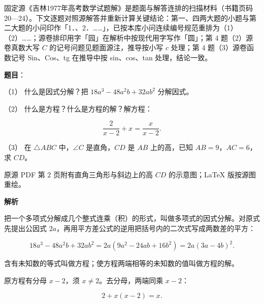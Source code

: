 

\begin{gktip}
固定源《吉林1977年高考数学试题解》是题面与解答连排的扫描材料（书籍页码 20—24）。下文逐题对照源解答并重新计算关键结论：第一、四两大题的小题与第二大题的小问印作「1．、2．……」，已按本库小问连续编号规范重排为（1）（2）……；源卷排印用字「园」在解析中按现代用字写作「圆」；第 4 题（2）源卷真数大写 $C$ 的记号问题见题面源注，推导按小写 $c$ 处理；第 4 题（3）源卷函数记号 Sin、Cos、tg 在推导中按 sin、cos、tan 处理，结论一致。
\end{gktip}

\begin{answer}

\textbf{题目}：

（1） 什么是因式分解？把 $18a^3-48a^2b+32ab^2$ 分解因式。

（2） 什么是方程？什么是方程的解？解方程：

\nopagebreak[4]
\[
\frac{2}{x-2}+x=\frac{x}{x-2}.
\]

（3） 在 $\triangle ABC$ 中，$\angle C$ 是直角，$CD$ 是 $AB$ 上的高，已知 $AB=9$，$AC=6$，求 $CD$。

\begin{gktip}
原源 PDF 第 2 页附有直角三角形与斜边上的高 $CD$ 的示意图；LaTeX 版按源图重绘。
\end{gktip}
\nopagebreak[4]
\begin{center}\end{center}
\nopagebreak[4]
\textbf{解析}


把一个多项式分解成几个整式连乘（积）的形式，叫做多项式的因式分解。对原式先提出公因式 $2a$，再用平方差公式的逆用把括号内的二次式写成两数差的平方：

\nopagebreak[4]
\[
18a^3-48a^2b+32ab^2
=2a(9a^2-24ab+16b^2)
=2a(3a-4b)^2.
\]


含有未知数的等式叫做方程；使方程两端相等的未知数的值叫做方程的解。

原方程有分母 $x-2$，须 $x\ne2$。去分母，两端同乘 $x-2$：

\nopagebreak[4]
\[
2+x(x-2)=x.
\]


\end{answer}
